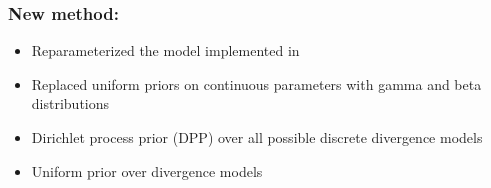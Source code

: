 
\begin{frame}
    \frametitle{New method: \dppmsbayes}
    \begin{itemize}
        \item<1-> Reparameterized the model implemented in \msb
        \item<2-> Replaced uniform priors on continuous parameters with gamma and
            beta distributions
        \item<3-> Dirichlet process prior (DPP) over all possible discrete divergence
            models
        \item<4-> Uniform prior over divergence models
    \end{itemize}
\end{frame}

